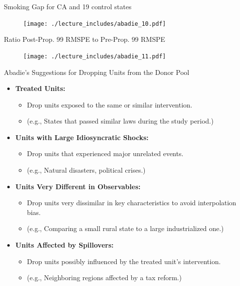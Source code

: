 \documentclass{beamer}
\begin{document}
\begin{frame}{Smoking Gap for CA and 19 control states}
	
	\begin{figure}
	\texttt{[image: ./lecture\_includes/abadie\_10.pdf]}
	\end{figure}
\end{frame}

\begin{frame}{Ratio Post-Prop. 99 RMSPE to Pre-Prop. 99 RMSPE}

	\begin{figure}
	\texttt{[image: ./lecture\_includes/abadie\_11.pdf]}
	\end{figure}
\end{frame}


\begin{frame}{Abadie's Suggestions for Dropping Units from the Donor Pool}
  \begin{itemize}
    \item \textbf{Treated Units:} 
    \begin{itemize}
      \item Drop units exposed to the same or similar intervention.
      \item (e.g., States that passed similar laws during the study period.)
    \end{itemize}
    \item \textbf{Units with Large Idiosyncratic Shocks:}
    \begin{itemize}
      \item Drop units that experienced major unrelated events.
      \item (e.g., Natural disasters, political crises.)
    \end{itemize}
    \item \textbf{Units Very Different in Observables:}
    \begin{itemize}
      \item Drop units very dissimilar in key characteristics to avoid interpolation bias.
      \item (e.g., Comparing a small rural state to a large industrialized one.)
    \end{itemize}
    \item \textbf{Units Affected by Spillovers:}
    \begin{itemize}
      \item Drop units possibly influenced by the treated unit’s intervention.
      \item (e.g., Neighboring regions affected by a tax reform.)
    \end{itemize}
  \end{itemize}
\end{frame}
\end{document}
